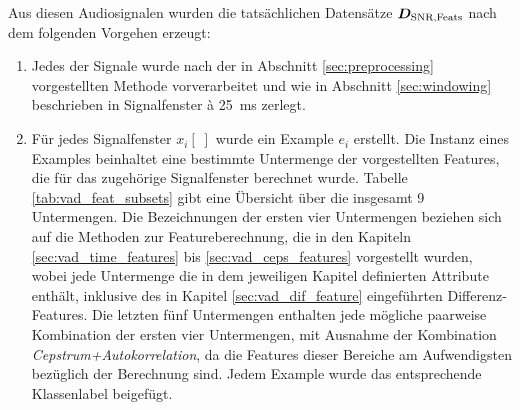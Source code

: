 Aus diesen Audiosignalen wurden die tatsächlichen Datensätze $\boldmath{D_{\text{SNR,Feats}}}$ nach dem folgenden Vorgehen erzeugt:
\begin{enumerate}
\item Jedes der Signale wurde nach der in Abschnitt \ref{sec:preprocessing} vorgestellten Methode vorverarbeitet und wie in Abschnitt \ref{sec:windowing} beschrieben in Signalfenster \`{a} \SI{25}{\milli\second} zerlegt.
\item Für jedes Signalfenster $x_i[\;]$ wurde ein Example $e_i$ erstellt. Die Instanz eines Examples beinhaltet eine bestimmte Untermenge der vorgestellten Features, die für das zugehörige Signalfenster berechnet wurde. Tabelle \ref{tab:vad_feat_subsets} gibt eine Übersicht über die insgesamt 9 Untermengen. Die Bezeichnungen der ersten vier Untermengen beziehen sich auf die Methoden zur Featureberechnung, die in den Kapiteln \ref{sec:vad_time_features} bis \ref{sec:vad_ceps_features} vorgestellt wurden, wobei jede Untermenge die in dem jeweiligen Kapitel definierten Attribute enthält, inklusive des in Kapitel \ref{sec:vad_dif_feature} eingeführten Differenz-Features. Die letzten fünf Untermengen enthalten jede mögliche paarweise Kombination der ersten vier Untermengen, mit Ausnahme der Kombination \emph{Cepstrum+Autokorrelation}, da die Features dieser Bereiche am Aufwendigsten bezüglich der Berechnung sind. Jedem Example wurde das entsprechende Klassenlabel beigefügt.


\end{enumerate}
